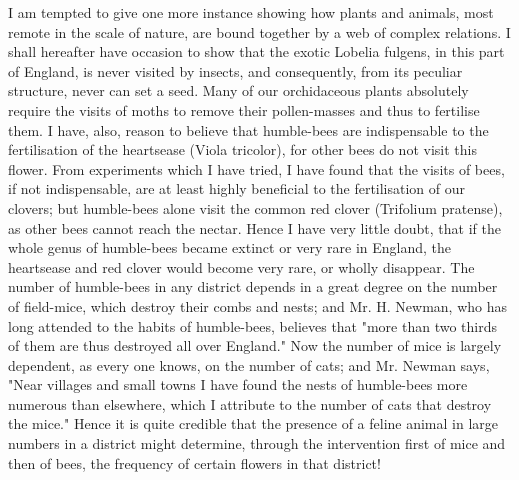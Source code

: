 I am tempted to give one more instance showing how plants and animals, most remote in the scale of nature, are bound together by a web of complex relations. I shall hereafter have occasion to show that the exotic Lobelia fulgens, in this part of England, is never visited by insects, and consequently, from its peculiar structure, never can set a seed. Many of our orchidaceous plants absolutely require the visits of moths to remove their pollen-masses and thus to fertilise them. I have, also, reason to believe that humble-bees are indispensable to the fertilisation of the heartsease (Viola tricolor), for other bees do not visit this flower. From experiments which I have tried, I have found that the visits of bees, if not indispensable, are at least highly beneficial to the fertilisation of our clovers; but humble-bees alone visit the common red clover (Trifolium pratense), as other bees cannot reach the nectar. Hence I have very little doubt, that if the whole genus of humble-bees became extinct or very rare in England, the heartsease and red clover would become very rare, or wholly disappear. The number of humble-bees in any district depends in a great degree on the number of field-mice, which destroy their combs and nests; and Mr. H. Newman, who has long attended to the habits of humble-bees, believes that "more than two thirds of them are thus destroyed all over England." Now the number of mice is largely dependent, as every one knows, on the number of cats; and Mr. Newman says, "Near villages and small towns I have found the nests of humble-bees more numerous than elsewhere, which I attribute to the number of cats that destroy the mice." Hence it is quite credible that the presence of a feline animal in large numbers in a district might determine, through the intervention first of mice and then of bees, the frequency of certain flowers in that district!
